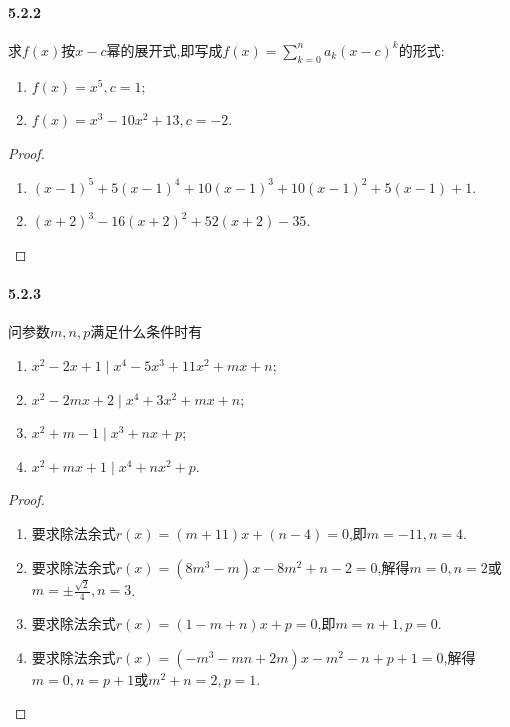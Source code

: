 \documentclass[11pt]{article}
\begin{document}
\paragraph{5.2.2}求$f(x)$按$x-c$幂的展开式,即写成$f(x)=\sum_{k=0}^n a_k (x-c)^k$的形式:
\begin{enumerate}
    \item $f(x)=x^5, c=1$;
    \item $f(x)=x^3-10x^2+13, c=-2$.
\end{enumerate}
\begin{proof}
    \begin{enumerate}
        \item $(x-1)^5+5(x-1)^4+10(x-1)^3+10(x-1)^2+5(x-1)+1$.
        \item $(x+2)^3-16(x+2)^2+52(x+2)-35$.
    \end{enumerate}
\end{proof}
\paragraph{5.2.3}问参数$m,n,p$满足什么条件时有
\begin{enumerate}
    \item $x^2-2x+1\mid x^4-5x^3+11x^2+mx+n$;
    \item $x^2-2mx+2\mid x^4+3x^2+mx+n$;
    \item $x^2+m-1\mid x^3+nx+p$;
    \item $x^2+mx+1\mid x^4+nx^2+p$.
\end{enumerate}
\begin{proof}
    \begin{enumerate}
        \item 要求除法余式$r(x)=(m+11)x+(n-4)=0$,即$m=-11, n=4$.
        \item 要求除法余式$r(x)=(8 m^3-m) x-8 m^2+n-2=0$,解得$m=0, n=2$或$m=\pm\frac{\sqrt{2}}{4}, n=3$.
        \item 要求除法余式$r(x)=(1-m+n)x+p=0$,即$m=n+1, p=0$.
        \item 要求除法余式$r(x)=(-m^3-m n+2 m)x -m^2-n+p+1=0$,解得$m=0, n=p+1$或$m^2+n=2, p=1$.
    \end{enumerate}
\end{proof}
\end{document}
